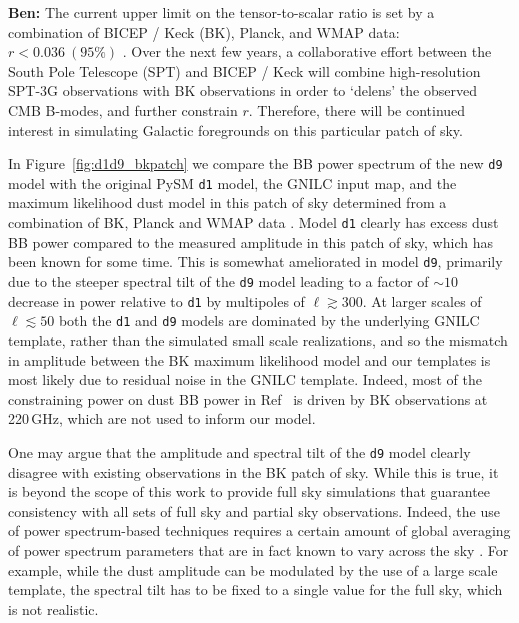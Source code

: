 \documentclass[twocolumn]{aastex631}
\newcommand{\done}{{\tt d1}}
\newcommand{\dnine}{{\tt d9}}
\begin{document}
\textbf{Ben:} The current upper limit on the tensor-to-scalar ratio is set by a combination of BICEP / Keck (BK), Planck, and WMAP data: $r < 0.036~(95\%)$ \citep{Ade:2021}. Over the next few years, a collaborative effort between the South Pole Telescope (SPT) and BICEP / Keck will combine high-resolution SPT-3G observations with BK observations in order to `delens' the observed CMB B-modes, and further constrain $r$. Therefore, there will be continued interest in simulating Galactic foregrounds on this particular patch of sky. 

In Figure~\ref{fig:d1d9_bkpatch} we compare the BB power spectrum of the new \dnine{} model with the original PySM \done{} model, the GNILC input map, and the maximum likelihood dust model in this patch of sky determined from a combination of BK, Planck and WMAP data \citep{Ade:2021}. Model \done{} clearly has excess dust BB power compared to the measured amplitude in this patch of sky, which has been known for some time. This is somewhat ameliorated in model \dnine{}, primarily due to the steeper spectral tilt of the \dnine{} model leading to a factor of $\sim 10$ decrease in power relative to \done{} by multipoles of $\ell \gtrsim 300$. At larger scales of $\ell \lesssim 50$ both the \done{} and \dnine{} models are dominated by the underlying GNILC template, rather than the simulated small scale realizations, and so the mismatch in amplitude between the BK maximum likelihood model and our templates is most likely due to residual noise in the GNILC template. Indeed, most of the constraining power on dust BB power in Ref~\cite{Ade:2021} is driven by BK observations at 220\,GHz, which are not used to inform our model. 

One may argue that the amplitude and spectral tilt of the \dnine{} model clearly disagree with existing observations in the BK patch of sky. While this is true, it is beyond the scope of this work to provide full sky simulations that guarantee consistency with all sets of full sky and partial sky observations. Indeed, the use of power spectrum-based techniques requires a certain amount of global averaging of power spectrum parameters that are in fact known to vary across the sky \cite{planck2016-l04}. For example, while the dust amplitude can be modulated by the use of a large scale template, the spectral tilt has to be fixed to a single value for the full sky, which is not realistic. 
\end{document}
